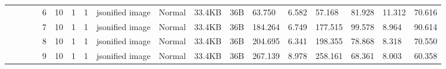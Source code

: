 \begin{landscape}
\begin{table}[]
{\begin{tabular}{@{}ccccllllllllllllll@{}}
                                                                                   &                              &                                &                                                                                                          & 6                                                     & 10                                       & 1                                          & 1                                 & jsonified image                  & Normal                             & 33.4KB                                        & 36B                                             & 63.750                  & 6.582    & 57.168                       & 81.928                  & 11.312   & 70.616                       \\
                                                                                   &                              &                                &                                                                                                          & 7                                                     & 10                                       & 1                                          & 1                                 & jsonified image                  & Normal                             & 33.4KB                                        & 36B                                             & 184.264                 & 6.749    & 177.515                      & 99.578                  & 8.964    & 90.614                       \\
                                                                                   &                              &                                &                                                                                                          & 8                                                     & 10                                       & 1                                          & 1                                 & jsonified image                  & Normal                             & 33.4KB                                        & 36B                                             & 204.695                 & 6.341    & 198.355                      & 78.868                  & 8.318    & 70.550                       \\
                                                                                   &                              &                                &                                                                                                          & 9                                                     & 10                                       & 1                                          & 1                                 & jsonified image                  & Normal                             & 33.4KB                                        & 36B                                             & 267.139                 & 8.978    & 258.161                      & 68.361                  & 8.003    & 60.358                       \\

\end{tabular}}
\end{table}
\end{landscape}
